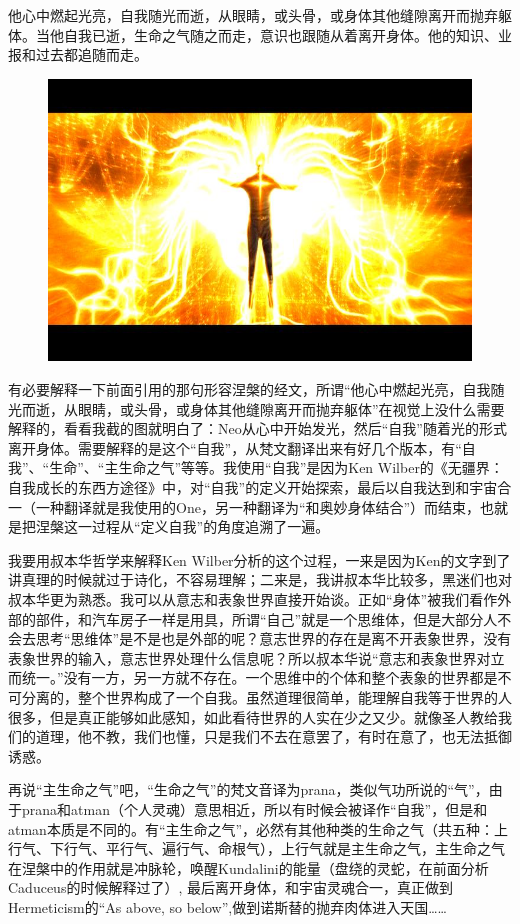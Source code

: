 \documentclass[UTF8]{ctexart}
\begin{document}
他心中燃起光亮，自我随光而逝，从眼睛，或头骨，或身体其他缝隙离开而抛弃躯体。当他自我已逝，生命之气随之而走，意识也跟随从着离开身体。他的知识、业报和过去都追随而走。

\begin{figure}[htb]
\centering
\includegraphics[width=0.5\linewidth]{fig/c18537d1d1f7413b9a502724.jpg}
\end{figure}

有必要解释一下前面引用的那句形容涅槃的经文，所谓“他心中燃起光亮，自我随光而逝，从眼睛，或头骨，或身体其他缝隙离开而抛弃躯体”在视觉上没什么需要解释的，看看我截的图就明白了：Neo从心中开始发光，然后“自我”随着光的形式离开身体。需要解释的是这个“自我”，从梵文翻译出来有好几个版本，有“自我”、“生命”、“主生命之气”等等。我使用“自我”是因为Ken Wilber的《无疆界：自我成长的东西方途径》中，对“自我”的定义开始探索，最后以自我达到和宇宙合一（一种翻译就是我使用的One，另一种翻译为“和奥妙身体结合”）而结束，也就是把涅槃这一过程从“定义自我”的角度追溯了一遍。

我要用叔本华哲学来解释Ken Wilber分析的这个过程，一来是因为Ken的文字到了讲真理的时候就过于诗化，不容易理解；二来是，我讲叔本华比较多，黑迷们也对叔本华更为熟悉。我可以从意志和表象世界直接开始谈。正如“身体”被我们看作外部的部件，和汽车房子一样是用具，所谓“自己”就是一个思维体，但是大部分人不会去思考“思维体”是不是也是外部的呢？意志世界的存在是离不开表象世界，没有表象世界的输入，意志世界处理什么信息呢？所以叔本华说“意志和表象世界对立而统一。”没有一方，另一方就不存在。一个思维中的个体和整个表象的世界都是不可分离的，整个世界构成了一个自我。虽然道理很简单，能理解自我等于世界的人很多，但是真正能够如此感知，如此看待世界的人实在少之又少。就像圣人教给我们的道理，他不教，我们也懂，只是我们不去在意罢了，有时在意了，也无法抵御诱惑。

再说“主生命之气”吧，“生命之气”的梵文音译为prana，类似气功所说的“气”，由于prana和atman（个人灵魂）意思相近，所以有时候会被译作“自我”，但是和atman本质是不同的。有“主生命之气”，必然有其他种类的生命之气（共五种：上行气、下行气、平行气、遍行气、命根气），上行气就是主生命之气，主生命之气在涅槃中的作用就是冲脉轮，唤醒Kundalini的能量（盘绕的灵蛇，在前面分析Caduceus的时候解释过了）, 最后离开身体，和宇宙灵魂合一，真正做到Hermeticism的“As above, so below”,做到诺斯替的抛弃肉体进入天国……
\end{document}
